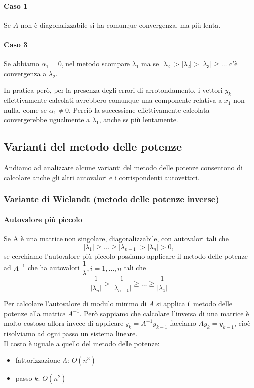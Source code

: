 \paragraph{Caso 1}
Se $A$ non è diagonalizzabile si ha comunque convergenza, ma più lenta.

\paragraph{Caso 3}
Se abbiamo $\alpha_1 = 0$, nel metodo scompare $\lambda_1$ ma se
$|\lambda_2| > |\lambda_2| > |\lambda_3| \geq \ldots$ c'è convergenza
a $\lambda_2$.

In pratica però, per la presenza degli errori di arrotondamento, i
vettori $y_k$ effettivamente calcolati avrebbero comunque una
componente relativa a $x_1$ non nulla, come se $\alpha_1 \neq
0$. Perciò la successione effettivamente calcolata convergerebbe
ugualmente a $\lambda_1$, anche se più lentamente.


\subsection{Varianti del metodo delle potenze}
Andiamo ad analizzare alcune varianti del metodo delle potenze
consentono di calcolare anche gli altri autovalori e i corrispondenti
autovettori.

\subsubsection{Variante di Wielandt (metodo delle potenze inverse)}
\paragraph{Autovalore pi\`u piccolo}
Se A \`e una matrice non singolare, diagonalizzabile, con autovalori
tali che
$$|\lambda_1 | \geq \ldots  \geq  |\lambda_{n-1} | > |\lambda_n | > 0,$$
se cerchiamo l'autovalore più piccolo possiamo applicare il metodo
delle potenze ad $A^{-1}$ che ha autovalori $\dfrac{1}{\lambda}, i = 1,\ldots ,
n $ tali che
$$ \dfrac{1}{|\lambda_n|} > \dfrac{1}{|\lambda_{n-1}|}  \geq
\ldots \geq \dfrac{1}{|\lambda_1|} $$

Per calcolare l'autovalore di modulo minimo di $A$ si applica il
metodo delle potenze alla matrice $A^{-1}$. Però sappiamo che
calcolare l'inversa di una matrice è molto costoso allora invece di
applicare $y_k = A^{-1} y_{k-1}$ facciamo $A y_k = y_{k-1}$, cioè
risolviamo ad ogni passo un sistema lineare.\\
Il costo è uguale a quello del metodo delle potenze:
\begin{itemize}
\item fattorizzazione $A$: $O(n^3)$
\item passo $k$: $O(n^2)$
\end{itemize}



